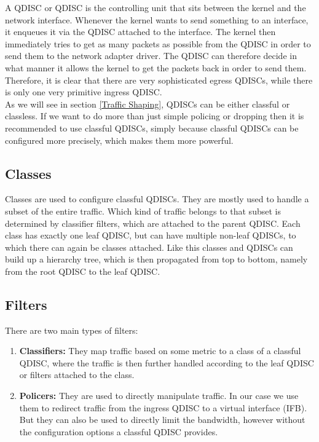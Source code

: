 A \acs{QDISC} or \acl{QDISC} is the controlling unit that sits between the kernel and the network interface. Whenever the kernel wants to send something to an interface, it enqueues it via the \acs{QDISC} attached to the interface. The kernel then immediately tries to get as many packets as possible from the \acs{QDISC} in order to send them to the network adapter driver. The \acs{QDISC} can therefore decide in what manner it allows the kernel to get the packets back in order to send them. Therefore, it is clear that there are very sophisticated egress \acsp{QDISC}, while there is only one very primitive ingress \acs{QDISC}.
\\
As we will see in section \ref{Traffic Shaping}, \acsp{QDISC} can be either classful or classless. If we want to do more than just simple policing or dropping then it is recommended to use classful \acsp{QDISC}, simply because classful \acsp{QDISC} can be configured more precisely, which makes them more powerful.

\subsection{Classes}

Classes are used to configure classful \acsp{QDISC}. They are mostly used to handle a subset of the entire traffic. Which kind of traffic belongs to that subset is determined by classifier filters, which are attached to the parent \acs{QDISC}. Each class has exactly one leaf \acs{QDISC}, but can have multiple non-leaf \acsp{QDISC}, to which there can again be classes attached. Like this classes and \acsp{QDISC} can build up a hierarchy tree, which is then propagated from top to bottom, namely from the root \acs{QDISC} to the leaf \acs{QDISC}.

\subsection{Filters}
There are two main types of filters:
\begin{enumerate}
\item \textbf{Classifiers:} They map traffic based on some metric to a class of a classful \acs{QDISC}, where the traffic is then further handled according to the leaf \acs{QDISC} or filters attached to the class.
\item \textbf{Policers:} They are used to directly manipulate traffic. In our case we use them to redirect traffic from the ingress \acs{QDISC} to a virtual interface (\ac{IFB}). But they can also be used to directly limit the bandwidth, however without the configuration options a classful \acs{QDISC} provides.
\end{enumerate}


